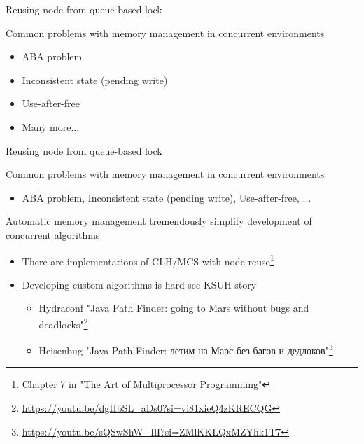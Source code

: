 \begin{frame}[t,noframenumbering]{Reusing node from queue-based lock}

Common problems with memory management in concurrent environments
\begin{itemize}
  \item ABA problem
  \item Inconsistent state (pending write)
  \item Use-after-free
  \pause
  \item Many more...
\end{itemize}
\end{frame}


\begin{frame}[t,noframenumbering]{Reusing node from queue-based lock}

Common problems with memory management in concurrent environments
\begin{itemize}
  \item ABA problem, Inconsistent state (pending write), Use-after-free, ...
\end{itemize}

\pause
Automatic memory management tremendously simplify development of concurrent algorithms

\begin{itemize}
  \pause \item There are implementations of CLH/MCS with node reuse\footnote<3->{Chapter 7 in "The Art of Multiprocessor Programming"}
  \pause \item Developing custom algorithms is hard \pause see KSUH story
  \begin{itemize}
    \item Hydraconf "Java Path Finder: going to Mars without bugs and deadlocks"\footnote<5->{\tiny\url{https://youtu.be/dgHbSL_aDs0?si=vi81xieQ4zKRECQG}}
    \item Heisenbug "Java Path Finder: летим на Марс без багов и дедлоков"\footnote<5->{\tiny\url{https://youtu.be/sQSwShW_IlI?si=ZMlKKLQxMZYhk1T7}}
  \end{itemize}
\end{itemize}
\end{frame}

